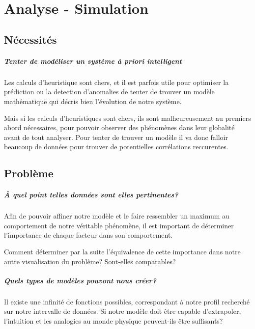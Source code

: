 \chapter{Analyse - Simulation}
	
	\section{Nécessités}
	
		\paragraph{Tenter de modéliser un système à priori intelligent}
		Les calculs d'heuristique sont chers, et il est parfois utile pour optimiser la prédiction ou la detection d'anomalies de tenter de trouver un modèle mathématique qui décris bien l'évolution de notre système.
		
		Mais si les calculs d'heuristiques sont chers, ils sont malheureusement au premiers abord nécessaires, pour pouvoir observer des phénomènes dans leur globalité avant de tout analyser. Pour tenter de trouver un modèle il va donc falloir beaucoup de données pour trouver de potentielles corrélations reccurentes.
 
	
	\section{Problème}
	
		\paragraph{À quel point telles données sont elles pertinentes?}
		Afin de pouvoir affiner notre modèle et le faire ressembler un maximum au comportement de notre véritable phénomène, il est important de déterminer l'importance de chaque facteur dans son comportement.
		
		Comment déterminer par la suite l'équivalence de cette importance dans notre autre visualisation du problème? Sont-elles comparables?
		
		\paragraph{Quels types de modèles pouvont nous créer?}
		Il existe une infinité de fonctions possibles, correspondant à notre profil recherché sur notre intervalle de données.
		Si notre modèle doit être capable d'extrapoler, l'intuition et les analogies au monde physique peuvent-ils être suffisants? 
		
